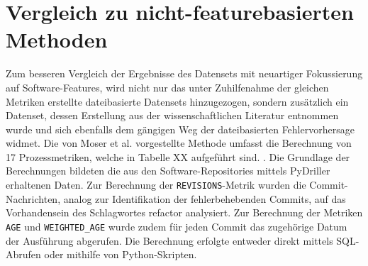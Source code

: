 
\section{Vergleich zu nicht-featurebasierten Methoden}

Zum besseren Vergleich der Ergebnisse des Datensets mit neuartiger Fokussierung auf Software-Features, wird nicht nur das unter Zuhilfenahme der gleichen Metriken erstellte dateibasierte Datensets hinzugezogen, sondern zusätzlich ein Datenset, dessen Erstellung aus der wissenschaftlichen Literatur entnommen wurde und sich ebenfalls dem gängigen Weg der dateibasierten Fehlervorhersage widmet. Die von Moser et al. vorgestellte Methode umfasst die Berechnung von 17 Prozessmetriken, welche in Tabelle XX aufgeführt sind. \cite{Moser2008}. Die Grundlage der Berechnungen bildeten die aus den Software-Repositories mittels PyDriller erhaltenen Daten. Zur Berechnung der \texttt{REVISIONS}-Metrik wurden die Commit-Nachrichten, analog zur Identifikation der fehlerbehebenden Commits, auf das Vorhandensein des Schlagwortes \glqq refactor\grqq{} analysiert. Zur Berechnung der Metriken \texttt{AGE} und \texttt{WEIGHTED\_AGE} wurde zudem für jeden Commit das zugehörige Datum der Ausführung abgerufen. Die Berechnung erfolgte entweder direkt mittels SQL-Abrufen oder mithilfe von Python-Skripten. 

